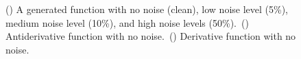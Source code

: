 \begin{figure}[H]
  \centering
  \begin{subfigure}{\linewidth}
    \begin{adjustbox}{width=\linewidth}
      
    \end{adjustbox}
    \caption{}\label{fig:antiderivative_noise_levels}
  \end{subfigure}
  \begin{subfigure}{\linewidth}
    \begin{adjustbox}{width=\linewidth}
      
    \end{adjustbox}
    \caption{}\label{fig:antiderivative}
  \end{subfigure}
  \begin{subfigure}{\linewidth}
    \begin{adjustbox}{width=\linewidth}
      
    \end{adjustbox}
    \caption{}\label{fig:derivative}
  \end{subfigure}
  \caption{() A generated function with no noise (clean), low noise level (5\%), medium noise level (10\%), and high noise levels (50\%).\ () Antiderivative function with no noise.\ () Derivative function with no noise.}
\end{figure}

